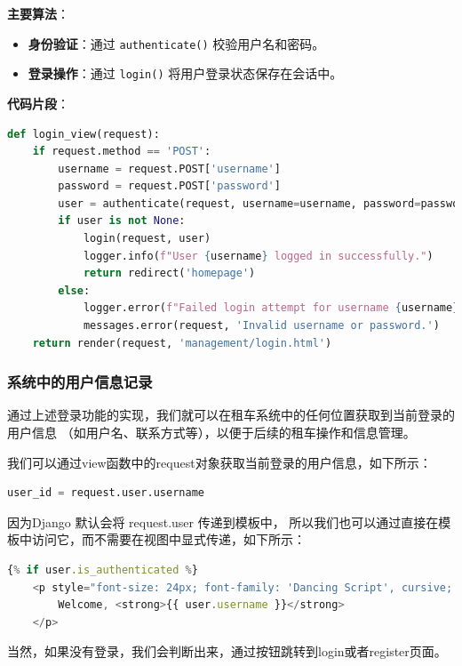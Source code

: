 \documentclass[UTF8,a4paper,12pt]{ctexart}
\begin{document}
\textbf{主要算法}：
\begin{itemize}
    \item \textbf{身份验证}：通过 \texttt{authenticate()} 校验用户名和密码。
    \item \textbf{登录操作}：通过 \texttt{login()} 将用户登录状态保存在会话中。
\end{itemize}

\textbf{代码片段}：
\begin{lstlisting}[language=Python]
def login_view(request):
    if request.method == 'POST':
        username = request.POST['username']
        password = request.POST['password']
        user = authenticate(request, username=username, password=password)
        if user is not None:
            login(request, user)
            logger.info(f"User {username} logged in successfully.")
            return redirect('homepage') 
        else:
            logger.error(f"Failed login attempt for username {username}.")
            messages.error(request, 'Invalid username or password.')
    return render(request, 'management/login.html')
\end{lstlisting}

\subsubsection{系统中的用户信息记录}

通过上述登录功能的实现，我们就可以在租车系统中的任何位置获取到当前登录的用户信息
（如用户名、联系方式等），以便于后续的租车操作和信息管理。

我们可以通过view函数中的request对象获取当前登录的用户信息，如下所示：

\begin{lstlisting}[language=Python]
    user_id = request.user.username  
\end{lstlisting}

因为Django 默认会将 request.user 传递到模板中，
所以我们也可以通过直接在模板中访问它，而不需要在视图中显式传递，如下所示：

\begin{lstlisting}[language=JavaScript]
    {% if user.is_authenticated %}
    <p style="font-size: 24px; font-family: 'Dancing Script', cursive; color: #7b1efc; font-weight: bold;">
        Welcome, <strong>{{ user.username }}</strong>
    </p>
\end{lstlisting}

当然，如果没有登录，我们会判断出来，通过按钮跳转到login或者register页面。
\end{document}
